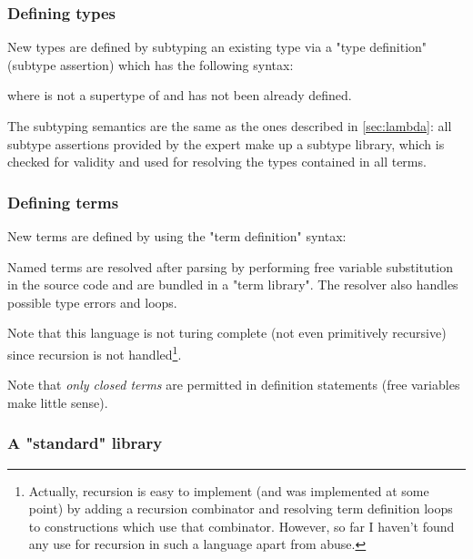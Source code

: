\documentclass[main.tex]{subfiles}
\begin{document}
\subsubsection{Defining types}
New types are defined by subtyping an existing type via a "type definition"
(subtype assertion) which has the following syntax:
\begin{center}
\end{center}
where  is not a supertype of  and has not been
already defined.

The subtyping semantics
are the same as the ones described in \cref{sec:lambda}: all subtype assertions
provided by the expert
make up a subtype library, which is checked for validity and used for resolving
the types contained in all terms.

\subsubsection{Defining terms}
New terms are defined by using the "term definition" syntax:
\begin{center}
\end{center}

Named terms are resolved after parsing by performing free variable substitution
in the source code and are bundled in a "term library". The resolver also
handles possible type errors and loops.

Note that this language is not turing complete (not even primitively recursive)
since recursion is not handled\footnote{
    Actually, recursion is easy to implement (and was implemented at some point)
    by adding a recursion combinator
    and resolving term definition loops to constructions which use that combinator.
    However, so far I haven't found any use for recursion in such a language
    apart from abuse.
}.

Note that \emph{only closed terms} are permitted in definition statements
(free variables make little sense).

\subsubsection{A "standard" library}
\label{stdlib}
\end{document}
